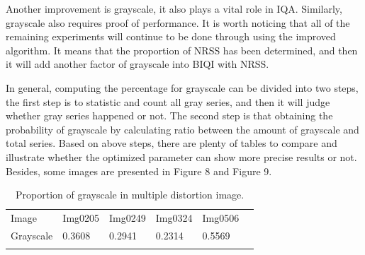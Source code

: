 \par Another improvement is grayscale, it also plays a vital role in IQA. Similarly, grayscale also requires proof of performance. It is worth noticing that all of the remaining experiments will continue to be done through using the improved algorithm. It means that the proportion of NRSS has been determined, and then it will add another factor of grayscale into BIQI with NRSS. 
\par In general, computing the percentage for grayscale can be divided into two steps, the first step is to statistic and count all gray series, and then it will judge whether gray series happened or not. The second step is that obtaining the probability of grayscale by calculating ratio between the amount of grayscale and total series. Based on above steps, there are plenty of tables to compare and illustrate whether the optimized parameter can show more precise results or not. Besides, some images are presented in Figure 8 and Figure 9.

\begin{table}
\caption{Proportion of grayscale in multiple distortion image.}
\label{tab:5}       
\begin{tabular}{llllll}
\hline\noalign{\smallskip}
Image & Img0205 & Img0249 & Img0324 & Img0506 &\\
\noalign{\smallskip}\hline\noalign{\smallskip}
Grayscale	  &0.3608    &0.2941	&0.2314 	&0.5569  	\\
\noalign{\smallskip}\hline
\end{tabular}
\end{table}







